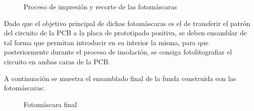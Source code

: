 \begin{itemize}
    \begin{figure}[H]
    \centering
    \caption{Proceso de impresión y recorte de las fotomáscaras} \label{fig:lego}
    \end{figure}
    
    Dado que el objetivo principal de dichas fotomáscaras es el de transferir el patrón del circuito de la PCB a la placa de prototipado positiva, se deben ensamblar de tal forma que permitan introducir en su interior la misma, para que posteriormente durante el proceso de insolación, se consiga fotolitografiar el circuito en ambas caras de la PCB.
    
    A continuación se muestra el ensamblado final de la funda construida con las fotomáscaras:
    
    \begin{figure}[H]
    \centering
    \caption{Fotomáscara final} \label{fig:lego}
    \end{figure}
    

\end{itemize}
